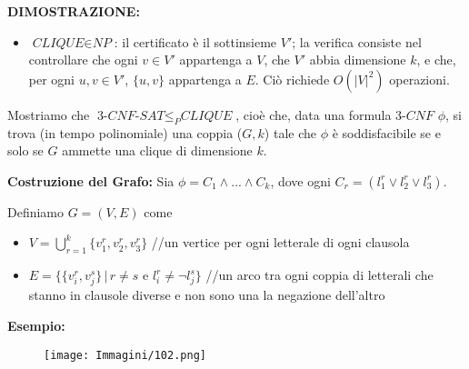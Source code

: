 \documentclass{article}
\begin{document}
\text{}
\newline
\textbf{DIMOSTRAZIONE:}
\begin{itemize}
    \item $\textit{CLIQUE} \in \textit{NP}$: il certificato è il sottinsieme $V'$; la verifica consiste nel controllare che ogni $v \in V'$ appartenga a $V$, che $V'$ abbia dimensione $k$, e che, per ogni $u, v \in V'$, $\{u, v\}$ appartenga a $E$. Ciò richiede $O(|V|^2)$ operazioni.
\end{itemize}
Mostriamo che $\textit{3-CNF-SAT} \leq_P \textit{CLIQUE}$, cioè che, data una formula 3-$CNF$ $\phi$, si trova (in tempo polinomiale) una coppia ($G,k$) tale che $\phi$ è soddisfacibile se e solo se $G$ ammette una clique di dimensione $k$.

\textbf{Costruzione del Grafo:}
Sia $\phi = C_1 \land ... \land C_k$, dove ogni $C_r = (l_{1}^r \lor l_{2}^r \lor l_{3}^r)$.

Definiamo $G = (V,E)$ come 
\begin{itemize}
    \item $V = \bigcup_{r=1}^{k} \{v_{1}^r, v_{2}^r, v_{3}^r\}$ //un vertice per ogni letterale di ogni clausola
    \item $E = \{\{v_{i}^r, v_{j}^s\} \,|\, r \neq s \text{ e } l_{i}^r \neq \neg l_{j}^s\}$  //un arco tra ogni coppia di letterali che stanno in clausole diverse e non sono una la negazione dell’altro
\end{itemize}

\textbf{Esempio:}
\begin{figure}[H]
    \centering
    \texttt{[image: Immagini/102.png]}
    \label{fig:clique-example}
\end{figure}
\end{document}
